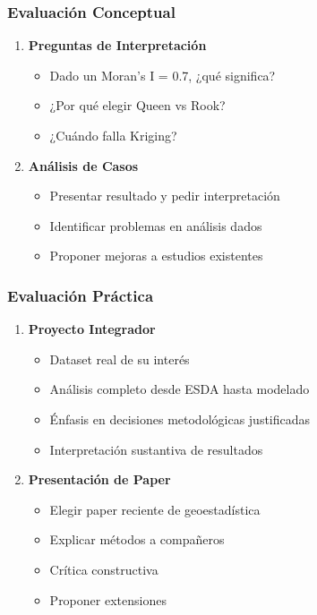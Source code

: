 \documentclass[12pt,a4paper]{article}
\begin{document}
\subsubsection{Evaluación Conceptual}

\begin{enumerate}
    \item \textbf{Preguntas de Interpretación}
    \begin{itemize}
        \item Dado un Moran's I = 0.7, ¿qué significa?
        \item ¿Por qué elegir Queen vs Rook?
        \item ¿Cuándo falla Kriging?
    \end{itemize}
    
    \item \textbf{Análisis de Casos}
    \begin{itemize}
        \item Presentar resultado y pedir interpretación
        \item Identificar problemas en análisis dados
        \item Proponer mejoras a estudios existentes
    \end{itemize}
\end{enumerate}

\subsubsection{Evaluación Práctica}

\begin{enumerate}
    \item \textbf{Proyecto Integrador}
    \begin{itemize}
        \item Dataset real de su interés
        \item Análisis completo desde ESDA hasta modelado
        \item Énfasis en decisiones metodológicas justificadas
        \item Interpretación sustantiva de resultados
    \end{itemize}
    
    \item \textbf{Presentación de Paper}
    \begin{itemize}
        \item Elegir paper reciente de geoestadística
        \item Explicar métodos a compañeros
        \item Crítica constructiva
        \item Proponer extensiones
    \end{itemize}
\end{enumerate}
\end{document}
